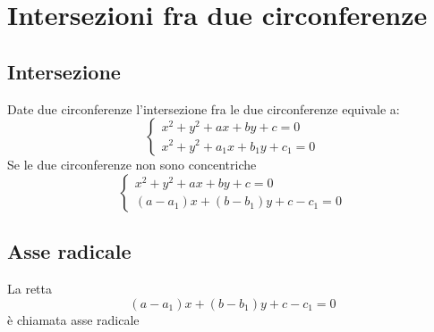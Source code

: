 \chapter{Intersezioni fra due circonferenze}
\begin{center}
	
\end{center}
\section{Intersezione} Date due circonferenze l'intersezione fra le due circonferenze equivale a: 
\begin{equation*}
\begin{cases}
x^2+y^2+ax+by+c=0\\
x^2+y^2+a_1x+b_1y+c_1=0
\end{cases}
\end{equation*}
Se le due circonferenze non sono concentriche 
\begin{equation*}
\begin{cases}
x^2+y^2+ax+by+c=0\\
(a-a_1)x+(b-b_1)y+c-c_1=0
\end{cases}
\end{equation*}
\section{Asse radicale}
La retta \begin{equation*}
(a-a_1)x+(b-b_1)y+c-c_1=0
\end{equation*} è chiamata asse radicale